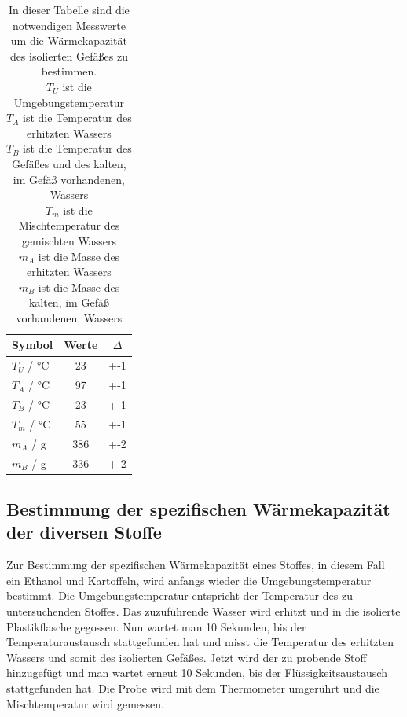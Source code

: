 \documentclass[11pt, ngerman]{scrartcl}
\begin{document}
\begin{table}[H]
    \centering
    \caption{In dieser Tabelle sind die notwendigen Messwerte um die 
    Wärmekapazität des isolierten Gefäßes zu bestimmen. \\
    $T_U$ ist die Umgebungstemperatur \\
    $T_A$ ist die Temperatur des erhitzten Wassers \\
    $T_B$ ist die Temperatur des Gefäßes und des kalten, im Gefäß vorhandenen, Wassers \\
    $T_m$ ist die Mischtemperatur des gemischten Wassers \\
    $m_A$ ist die Masse des erhitzten Wassers \\
    $m_B$ ist die Masse des kalten, im Gefäß vorhandenen, Wassers \\
    }
    \label{tab:messwerte_gefass}
    \begin{tabular}{l|S|S}
        Symbol                    & {Werte} & {$\Delta$} \\ \hline
        $T_U$   / \si{\celsius}                  & 23     &  +-1  \\ 
    	$T_A$   / \si{\celsius}                  & 97     &  +-1   \\
    	$T_B$   / \si{\celsius}                  & 23     &  +-1   \\
        $T_m$   / \si{\celsius}                  & 55     &  +-1   \\
        $m_A$   / \si{\g}                  & 386     & +-2   \\
        $m_B$   / \si{\g}                  & 336     & +-2   \\ \hline
    \end{tabular}
\end{table}

\subsection{Bestimmung der spezifischen Wärmekapazität der diversen Stoffe}
Zur Bestimmung der spezifischen Wärmekapazität eines Stoffes, in diesem Fall ein
Ethanol und Kartoffeln, wird anfangs wieder die Umgebungstemperatur
bestimmt. Die Umgebungstemperatur entspricht der Temperatur des zu
untersuchenden Stoffes. Das zuzuführende Wasser wird erhitzt und in die
isolierte Plastikflasche gegossen. Nun wartet man 10 Sekunden, bis der
Temperaturaustausch stattgefunden hat und misst die Temperatur des erhitzten
Wassers und somit des isolierten Gefäßes. Jetzt wird der zu probende Stoff
hinzugefügt und man wartet erneut 10 Sekunden, bis der Flüssigkeitsaustausch
stattgefunden hat. Die Probe wird mit dem Thermometer umgerührt und die
Mischtemperatur wird gemessen.
\end{document}
